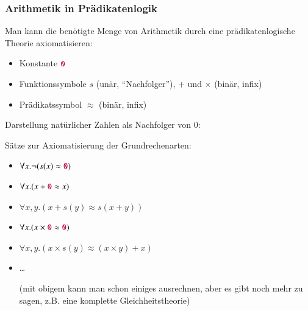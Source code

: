 \documentclass[aspectratio=1610,onlymath]{beamer}
\begin{document}
\begin{frame}\frametitle{Arithmetik in Prädikatenlogik}

Man kann die benötigte Menge von Arithmetik durch eine prädikatenlogische Theorie axiomatisieren:
\begin{itemize}
\item Konstante $\mathtt{\textcolor{purple}{0}}$
\item Funktionssymbole $s$ (unär, "`Nachfolger"'), $+$ und $\times$ (binär, infix)
\item Prädikatssymbol $\approx$ (binär, infix)
\end{itemize}

Darstellung natürlicher Zahlen als Nachfolger von 0:\\[0.5ex]
\bigskip

Sätze zur Axiomatisierung der Grundrechenarten:
\begin{itemize}
\item $\forall x.\neg(s(x)\approx \mathtt{\textcolor{purple}{0}})$
\item $\forall x.(x+\mathtt{\textcolor{purple}{0}}\approx x)$ 
\item $\forall x,y.(x+s(y)\approx s(x+y))$
\item $\forall x.(x\times \mathtt{\textcolor{purple}{0}}\approx \mathtt{\textcolor{purple}{0}})$ 
\item $\forall x,y.(x\times s(y)\approx (x\times y)+x)$
\item \ldots {\tiny (mit obigem kann man schon einiges ausrechnen, aber es gibt noch mehr zu sagen, z.B. eine komplette Gleichheitstheorie)

}
\end{itemize}

\end{frame}

\end{document}
